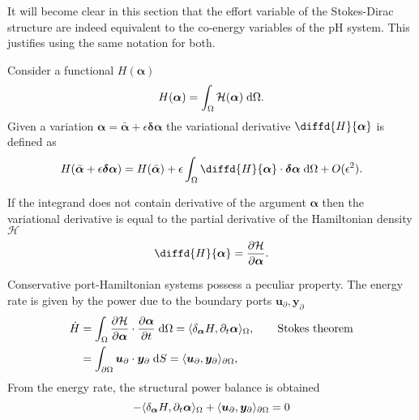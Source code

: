\begin{remark}
	It will become clear in this section that the effort variable of the Stokes-Dirac structure are indeed equivalent to the co-energy variables of the pH system. This justifies using the same notation for both.
\end{remark}

\begin{definition}
Consider a functional $H(\bm{\alpha})$
\[ H(\bm{\alpha}) = \int_{\Omega} \mathcal{H}(\bm{\alpha}) \d{\Omega}.
\]
Given a variation $\bm{\alpha} = \bar{\bm{\alpha}} + \epsilon \bm{\delta\alpha}$ the variational derivative $\diffd{H}{\bm{\alpha}}$ is defined as
\[
H(\bar{\bm{\alpha}} + \epsilon \bm{\delta\alpha}) = H(\bar{\bm{\alpha}}) + \epsilon \int_{\Omega} \diffd{H}{\bm{\alpha}} \cdot \bm{\delta\alpha} \d{\Omega} + O(\epsilon^2).
\]
\end{definition}
\begin{remark}
If the integrand does not contain derivative of the argument $\bm{\alpha}$ then the variational derivative is equal to the partial derivative of the Hamiltonian density $\mathcal{H}$
\[
\diffd{H}{\bm{\alpha}} = \diffp{\mathcal{H}}{\bm{\alpha}}.
\]
\end{remark}


Conservative port-Hamiltonian systems possess a peculiar property. The energy rate is given by the power due to the boundary ports $\bm{u}_\partial, \bm{y}_\partial$
\begin{equation}\label{eq:enrate}
\begin{aligned}
\dot{H} &= \int_{\Omega} \diffp{\mathcal{H}}{\bm{\alpha}} \cdot \diffp{\bm{\alpha}}{t} \d{\Omega} =\inner[\Omega]{\dder{H}{\bm{\alpha}}}{\pder{\bm{\alpha}}{t}}, \qquad \text{Stokes theorem}\\
&=\int_{\partial \Omega} \bm{u}_\partial \cdot \bm{y}_\partial \d{S} =\inner[\partial \Omega]{\bm{u}_\partial}{\bm{y}_\partial},
\end{aligned}
\end{equation} 
From the energy rate, the structural power balance is obtained
\begin{equation}\label{eq:strpow}
-\inner[\Omega]{\dder{H}{\bm{\alpha}}}{\pder{\bm{\alpha}}{t}} + \inner[\partial \Omega]{\bm{u}_\partial}{\bm{y}_\partial} = 0
\end{equation}


